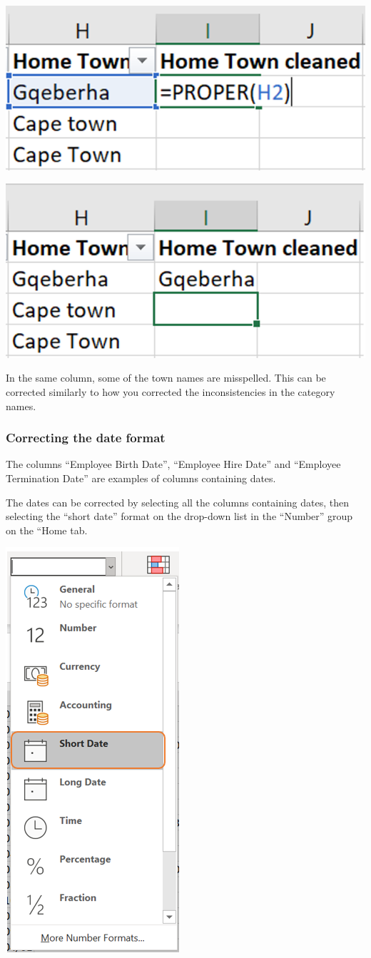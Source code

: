 \documentclass[
]{book}
\begin{document}
\begin{center}\includegraphics[width=0.4\linewidth]{Figures/capitals_5} \end{center}

\begin{center}\includegraphics[width=0.4\linewidth]{Figures/capitals_6} \end{center}

In the same column, some of the town names are misspelled. This can be corrected similarly to how you corrected the inconsistencies in the category names.

\subsubsection*{Correcting the date format}\label{correcting-the-date-format}

The columns ``Employee Birth Date'', ``Employee Hire Date'' and ``Employee Termination Date'' are examples of columns containing dates.

The dates can be corrected by selecting all the columns containing dates, then selecting the ``short date'' format on the drop-down list in the ``Number'' group on the ``Home tab.

\begin{center}\includegraphics[width=0.4\linewidth]{Figures/dates} \end{center}
\end{document}
